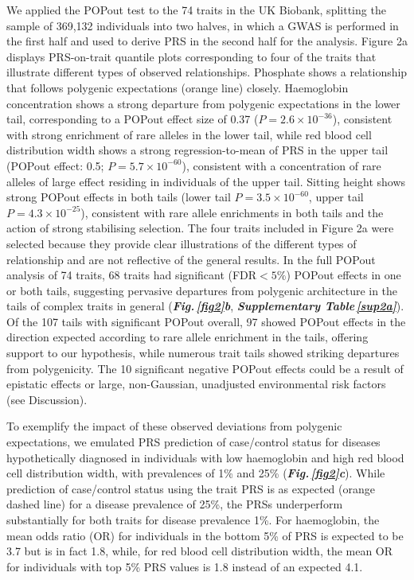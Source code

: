 \documentclass[12pt]{zHenriquesLab-StyleBioRxiv}
\newcommand\dref[2]{\normalsize{\textbf{\textit{Fig.\,\ref{#1}#2}}}\normalsize{}}
\newcommand\stref[1]{\normalsize{\textbf{\textit{Supplementary Table\,\ref{#1}}}}\normalsize{}}
\begin{document}
%
We applied the POPout test to the 74 traits in the UK Biobank, 
splitting the sample of 369,132 individuals into two halves, 
in which a GWAS is performed in the first half and used to derive 
PRS in the second half for the analysis. 
Figure 2a  displays PRS-on-trait quantile plots corresponding 
to four of the traits that illustrate different types of 
observed relationships. Phosphate shows a relationship that 
follows polygenic expectations (orange line) closely. 
Haemoglobin concentration shows a strong departure from 
polygenic expectations in the lower tail, corresponding 
to a POPout effect size of 0.37 ($P = 2.6 \times 10^{-36}$), 
consistent with strong enrichment of rare alleles in the lower 
tail, while red blood cell distribution width shows a strong 
regression-to-mean of PRS in the upper tail (POPout effect: 
0.5; $P = 5.7 \times 10^{-60}$), consistent with a concentration
of rare alleles of large effect residing in individuals of 
the upper tail. Sitting height shows strong POPout effects in both 
tails (lower tail $P = 3.5 \times 10^{-60}$, upper 
tail $P = 4.3 \times 10^{-25}$), consistent with rare allele 
enrichments in both tails and the action of strong 
stabilising selection. The four traits included in Figure 2a 
were selected because they provide clear illustrations 
of the different types of relationship and are not reflective of 
the general results. In the full POPout analysis of 74 traits, 
68 traits had significant (FDR$<5\%$) POPout effects in one or both 
tails, suggesting pervasive departures from polygenic 
architecture in the tails of complex traits in 
general (\dref{fig2}{b}, \stref{sup2a}). 
Of the 107 tails with significant 
POPout overall, 97 showed POPout effects in the 
direction expected according to rare allele enrichment 
in the tails, offering support to our hypothesis, while 
numerous trait tails showed striking departures from polygenicity. 
The 10 significant negative POPout effects could be a result 
of epistatic effects or large, non-Gaussian, 
unadjusted environmental risk factors (see Discussion). 

To exemplify the impact of these observed deviations from 
polygenic expectations, we emulated PRS prediction of 
case/control status for diseases hypothetically diagnosed 
in individuals with low haemoglobin and high red blood cell 
distribution width, with prevalences of 1\% and 25\% (\dref{fig2}{c}). 
While prediction of case/control status using the trait PRS 
is as expected (orange dashed line) for a disease prevalence 
of 25\%, the PRSs underperform substantially for both 
traits for disease prevalence 1\%. For haemoglobin, the mean 
odds ratio (OR) for individuals in the bottom 5\% of PRS is 
expected to be 3.7 but is in fact 1.8, while, for red blood 
cell distribution width, the mean OR for individuals 
with top 5\% PRS values is 1.8 instead of an expected 4.1.
%
\end{document}
